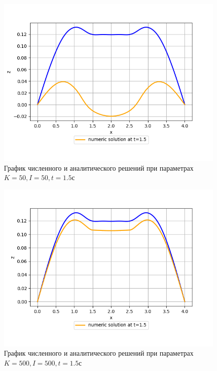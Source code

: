 {{	\begin{figure}[H]
		\begin{center}
			\includegraphics[width=0.58\pagewidth, height=0.3\pageheight]{plots/15_50_50}
			\caption{ График численного и аналитического решений при параметрах $K=50, I=50, t = 1.5с$}
		\end{center}
		\label{some_pic}
	\end{figure}
	
	\begin{figure}[H]
		\begin{center}
			\includegraphics[width=0.6\pagewidth, height=0.33\pageheight]{plots/15_500_500}
			\caption{График численного и аналитического решений при параметрах $K=500, I=500, t = 1.5с$}
		\end{center}
		\label{some_pic}
	\end{figure}

}}
